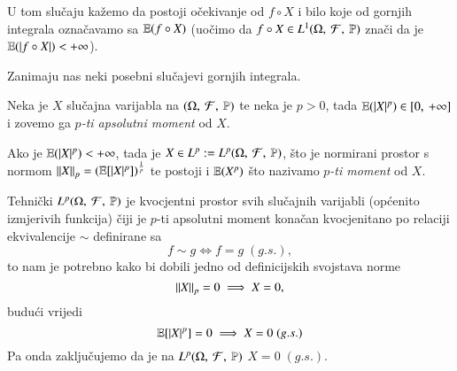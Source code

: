 \begin{figure}[H]
    \centering
\end{figure}
U tom slu\v caju ka\v zemo da postoji o\v cekivanje od $f \circ X$ i bilo koje od gornjih integrala ozna\v cavamo sa $\mathbb{E}({f \circ X})$
(uo\v cimo da $f \circ X \in L^1 (\Omega, \: \mathcal{F}, \: \mathbb{P})$ zna\v ci da je $\mathbb{E}({|f \circ X|}) < +\infty$).

Zanimaju nas neki posebni slu\v cajevi gornjih integrala.

\begin{defn}    \label{defn:5.11-1}
    Neka je $X$ slu\v cajna varijabla  na $(\Omega, \: \mathcal{F}, \: \mathbb{P})$ te neka je $p > 0$, tada $\mathbb{E}({|X|^p}) \in [{0}, \:{+\infty}]$ i zovemo ga \emph{$p$-ti apsolutni moment} od $X$.
    
    Ako je $\mathbb{E}({|X|^p}) < +\infty$, tada je $X \in L^p := L^p (\Omega, \: \mathcal{F}, \: \mathbb{P})$, \v sto je normirani prostor s normom $\left\lVert {X} \right\rVert_p = (\mathbb{E} [|X|^p])^{\frac{1}{p}}$ te postoji i $\mathbb{E}({X^p})$ \v sto nazivamo \emph{$p$-ti moment} od $X$.
\end{defn}

\begin{nap} \label{nap:5.11-2}
    Tehni\v cki $L^p (\Omega, \: \mathcal{F}, \: \mathbb{P})$ je kvocjentni prostor svih slu\v cajnih varijabli (op\' cenito izmjerivih funkcija) \v ciji je $p$-ti apsolutni moment kona\v can kvocjenitano po relaciji ekvivalencije $\sim$ definirane sa
    \begin{equation*}
        f \sim g \iff f = g \; (g.s.),
    \end{equation*}
    to nam je potrebno kako bi dobili jedno od definicijskih svojstava norme
    \begin{equation*}
        \left\lVert {X} \right\rVert_p = 0 \implies X = 0,
    \end{equation*}
    budu\' ci vrijedi
    \begin{equation*}
        \mathbb{E} [|X|^p] = 0 \implies X = 0 \; (g.s.)
    \end{equation*}
    Pa onda zaklju\v cujemo da je na $L^p (\Omega, \: \mathcal{F}, \: \mathbb{P})$ $X = 0 \; (g.s.)$.
\end{nap}

